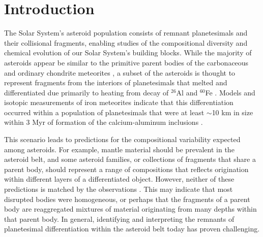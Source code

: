 \documentclass[]{aastex631}
\begin{document}
\keywords{}

\section{Introduction} \label{sec:intro}

The Solar System's asteroid population consists of remnant planetesimals and their collisional fragments, enabling studies of the compositional diversity and chemical evolution of our Solar System's building blocks. While the majority of asteroids appear be similar to the primitive parent bodies of the carbonaceous and ordinary chondrite meteorites \citep{gaffey1978,gaffey1993}, a subset of the asteroids is thought to represent fragments from the interiors of planetesimals that melted and differentiated due primarily to heating from decay of $^{26}$Al and $^{60}$Fe \citep{urey1955,sahijpal2007}. Models and isotopic measurements of iron meteorites indicate that this differentiation occurred within a population of planetesimals that were at least $\sim$10 km in size within 3 Myr of formation of the calcium-aluminum inclusions \citep{merk2002,hevey2006,kruijer2017}. 

This scenario leads to predictions for the compositional variability expected among asteroids. For example, mantle material should be prevalent in the asteroid belt, and some asteroid families, or collections of fragments that share a parent body, should represent a range of compositions that reflects origination within different layers of a differentiated object. However, neither of these predictions is matched by the observations \citep{cellino2002,demeo2019}. This may indicate that most disrupted bodies were homogeneous, or perhaps that the fragments of a parent body are reaggregated mixtures of material originating from many depths within that parent body. In general, identifying and interpreting the remnants of planetesimal differentiation within the asteroid belt today has proven challenging.
\end{document}
